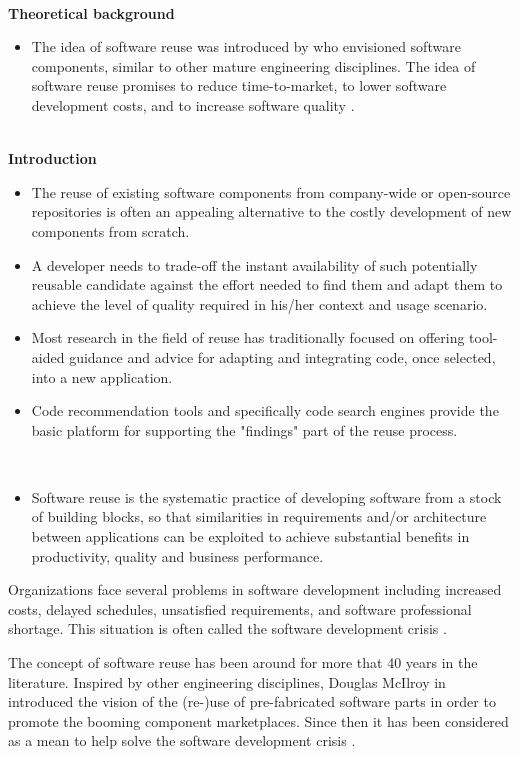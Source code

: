 \cite{Stefi2016} \\
\textbf{Theoretical background}
\begin{itemize}
\item The idea of software reuse was introduced by \cite{McIlroy1968} who envisioned software components, similar to other mature engineering disciplines. The idea of software reuse promises to reduce time-to-market, to lower software development costs, and to increase software quality \cite{Frakes2005}.
\end{itemize}

\cite{Kessel2016} \\
\textbf{Introduction}
\begin{itemize}
\item The reuse of existing software components from company-wide or open-source repositories is often an appealing alternative to the costly development of new components from scratch.
\item A developer needs to trade-off the instant availability of such potentially reusable candidate against the effort needed to find them and adapt them to achieve the level of quality required in his/her context and usage scenario.
\item Most research in the field of reuse has traditionally focused on offering tool-aided guidance and advice for adapting and integrating code, once selected, into a new application.
\item Code recommendation tools and specifically code search engines provide the basic platform for supporting the "findings" part of the reuse process. 
\end{itemize}

\cite{Ezran2002}\\
\begin{itemize}
\item Software reuse is the systematic practice of developing software from a stock of building blocks, so that similarities in requirements and/or architecture between applications can be exploited to achieve substantial benefits in productivity, quality and business performance.
\end{itemize}

Organizations face several problems in software development including increased costs, delayed schedules, unsatisfied requirements, and software professional shortage. This situation is often called the software development crisis \cite{Kim1992}.

The concept of software reuse has been around for more that 40 years in the literature. Inspired by other engineering disciplines, Douglas McIlroy in \citep{McIlroy1968} introduced the vision of the (re-)use of pre-fabricated software parts in order to promote the booming component marketplaces. Since then it has been considered as a mean to help solve the software development crisis \cite{Kim1992}.

